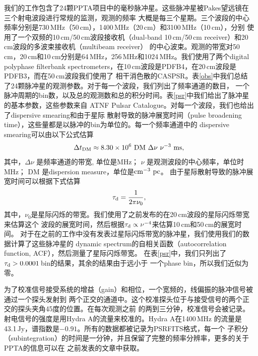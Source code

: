 我们的工作包含了24颗PPTA项目中的毫秒脉冲星。这些脉冲星被Pakes望远镜在三个射电波段进行常规的监测，观测的频率
大概是每三个星期。三个波段的中心频率分别是730\,MHz（50\,cm），1400\,MHz（20\,cm）和3100\,MHz（10\,cm），分别
使用了一个双频的10\,cm/50\,cm波段接收机（dual-band 10\,cm/50\,cm receiver）和20\,cm波段的多波束接收机（multibeam receiver）
的中心波束。观测的带宽对50\,cm，20\,cm和10\,cm分别是64\,MHz，256\,MHz和1024\,MHz。我们使用了两个digital 
polyphase filterbank spectrometers，在10\,cm波段是PDFB4，在20\,cm波段是PDFB3，而在50\,cm波段我们使用了
相干消色散的CASPSR。表\ref{obs}中我们总结了24颗脉冲星的观测参数。对于每一个波段，我们列出了频率通道的数目，
一个脉冲周期的bin数，以及总的观测数和总的积分时间。表\ref{psr}中我们给出了脉冲星的基本参数，这些参数来自
ATNF Pulsar Catalogue\supercite{Manchester05}。对每一个波段，我们也给出了dispersive smearing和由于星际
散射导致的脉冲展宽时间（pulse broadening time），这些量都是以脉冲的bin为单位的。每一个频率通道中的
dispersive smearing可以由以下公式估算
%
\begin{equation}
\Delta t_{\rm{DM}}\approx 8.30 \times 10^{6}\ \rm{DM}\ \Delta \nu\ \nu^{-3}\ \rm{ms},
\label{dm}
\end{equation}
%
其中，$\Delta \nu$ 是频率通道的带宽, 单位是MHz； $\nu$ 是观测波段的中心频率，单位时MHz； 
DM 是dispersion measure，单位是$\rm{cm^{-3}\ pc}$。
%
由于星际散射导致的脉冲展宽时间可以根据下式估算
%
\begin{equation}
\tau_{\rm{d}} = \frac{1}{2\pi\nu_0},
\end{equation}
%
其中，$\nu_0$是星际闪烁的带宽。我们使用了之前发布的在20\,cm波段的星际闪烁带宽来估算这个
波段的展宽时间\supercite{Keith13}，然后根据$\tau_{\rm{d}}\propto\nu^{-4}$来估算10\,cm和50\,cm的展宽时间。
对于在之前的工作中没有发表过星际闪烁带宽的脉冲星，我们使用我们的数据计算了这些脉冲星的
dynamic spectrum的自相关函数（autocorrelation function, ACF），然后测量了星际闪烁带宽\supercite{Wang05}。
在表\ref{psr}中，我们只列出了$\tau_{\rm{d}}>0.0001$\,bin的结果，其余的结果由于远小于
一个phase bin，所以我们近似为零。

为了校准信号接受系统的增益（gain）和相位，一个宽频的，线偏振的脉冲信号被通过一个探头发射到
两个正交的通道中。这个校准探头位于与接受信号的两个正交的探头夹角45度的位置。在每次观测之前
的两到三分钟，校准信号会被记录。射电信号的强度是用Hydra A的流量来校准的。Hydra A在1400\,MHz
的流量是43.1\,Jy，谱指数是$-0.91$。所有的数据都被记录为PSRFITS格式\supercite{Hotan04}，每一个
子积分（subintegration）的时间是一分钟，并且保留了完整的频率分辨率，更多的关于PPTA的信息可以在
之前发表的文章中获取\supercite{Manchester13}。

